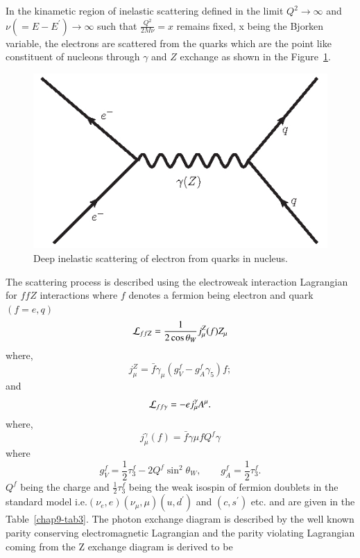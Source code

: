 In the kinametic region of inelastic scattering defined in the limit $Q^2\rightarrow \infty$ and $\nu(=E-E^\prime)\rightarrow \infty$  such that $\frac{Q^2}{2M\nu}=x$ remains fixed, x being the Bjorken  variable,  the  electrons are scattered from the quarks which are the point like  constituent of nucleons  through $\gamma$ and $Z$ exchange as shown in the Figure~\ref{chap9-fig4}. 
\medskip

\begin{figure}[H]
\centering
\includegraphics[scale=0.35]{src/images/chap9/fig3.jpg}
\caption{Deep inelastic scattering of electron from quarks in nucleus.}\label{chap9-fig4}
\end{figure}

The scattering process is described using the electroweak interaction Lagrangian for $ffZ$ interactions where $f$ denotes a fermion being electron  and quark $(f=e,q)$
\begin{equation}
{\cal L}_{ffZ}= \frac{1}{2\cos\theta_W} j^Z_\mu(f) Z_\mu \label{chap9-eq28}
\end{equation}
where,
\begin{equation}
j_\mu^Z = \bar{f}\gamma_\mu(g_V^f-g_A^f\gamma_5)f; \label{chap9-eq29}
\end{equation}
and
\begin{equation}
{\cal L}_{ff\gamma}=-ej^\gamma_\mu A^\mu. \label{chap9-eq30}
\end{equation}
where, 
\begin{equation}
j_\mu^\gamma (f)= \bar{f}\gamma\mu f Q^f \gamma \label{chap9-eq31}
\end{equation}
where
\begin{equation}
g_V^f=\frac{1}{2}\tau_3^f-2Q^f \sin^2\theta_W,~~~~~~~~~
g_A^f=\frac{1}{2}\tau^f_3. \label{chap9-eq32}
\end{equation}
$Q^f$ being the charge and $\frac{1}{2}\tau^f_3$ being the weak isospin of fermion doublets in the standard model  i.e.$(\nu_e, e)(\nu_\mu,\mu)(u, d^\prime)$ and $(c,s^\prime)$ etc. and are given in the Table~\ref{chap9-tab3}. The photon exchange diagram is described by the well known parity conserving electromagnetic Lagrangian and the parity violating Lagrangian coming from the Z exchange diagram is  derived to be 
\bigskip

